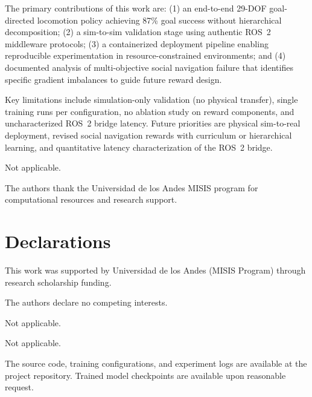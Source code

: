 \documentclass[pdflatex,sn-mathphys-num]{sn-jnl}%
\theoremstyle{thmstyleone}%
\theoremstyle{thmstyletwo}%
\theoremstyle{thmstylethree}%
\begin{document}
The primary contributions of this work are:
(1) an end-to-end 29-DOF goal-directed locomotion policy achieving 87\% goal
success without hierarchical decomposition;
(2) a sim-to-sim validation stage using authentic ROS~2 middleware protocols;
(3) a containerized deployment pipeline enabling reproducible experimentation
in resource-constrained environments;
and (4) documented analysis of multi-objective social navigation failure that
identifies specific gradient imbalances to guide future reward design.

Key limitations include simulation-only validation (no physical transfer),
single training runs per configuration, no ablation study on reward components,
and uncharacterized ROS~2 bridge latency.
Future priorities are physical sim-to-real deployment, revised social navigation
rewards with curriculum or hierarchical learning, and quantitative latency
characterization of the ROS~2 bridge.

\backmatter


Not applicable.


The authors thank the Universidad de los Andes MISIS program for computational resources and research support.

\section*{Declarations}


This work was supported by Universidad de los Andes (MISIS Program) through research scholarship funding.


The authors declare no competing interests.


Not applicable.


Not applicable.


The source code, training configurations, and experiment logs are available at the project repository.
Trained model checkpoints are available upon reasonable request.

\end{document}
